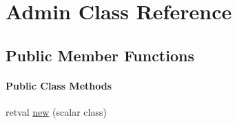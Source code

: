\hypertarget{class_d_jabberd_1_1_bot_1_1_admin}{
\section{\-Admin \-Class \-Reference}
\label{class_d_jabberd_1_1_bot_1_1_admin}
}
\subsection*{\-Public \-Member \-Functions}
\begin{Indent}\paragraph*{\-Public \-Class \-Methods}
\begin{DoxyCompactItemize}
\item 
retval \hyperlink{class_d_jabberd_1_1_bot_1_1_admin_a04de1185dad12c1c24cac9235c2bbeff}{new} (scalar class)
\end{DoxyCompactItemize}
\end{Indent}
